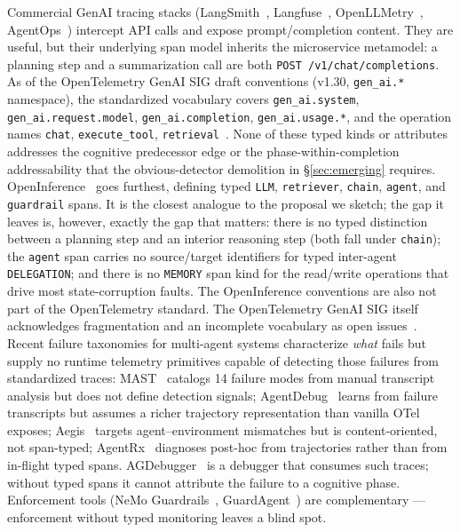 \documentclass[10pt,conference]{IEEEtran}
\begin{document}
Commercial GenAI tracing stacks (LangSmith~\cite{langsmith},
Langfuse~\cite{langfuse}, OpenLLMetry~\cite{openllmetry},
AgentOps~\cite{agentops}) intercept API calls and expose
prompt/completion content. They are useful, but their underlying span
model inherits the microservice metamodel: a planning step and a
summarization call are both \texttt{POST /v1/chat/completions}. As of
the OpenTelemetry GenAI SIG draft conventions (v1.30,
\texttt{gen\_ai.*} namespace), the standardized vocabulary covers
\texttt{gen\_ai.system}, \texttt{gen\_ai.request.model},
\texttt{gen\_ai.completion}, \texttt{gen\_ai.usage.*}, and the operation
names \texttt{chat}, \texttt{execute\_tool},
\texttt{retrieval}~\cite{otel_genai_sig}. None of these typed kinds or
attributes addresses the cognitive predecessor edge or the
phase-within-completion addressability that the obvious-detector
demolition in \S\ref{sec:emerging} requires.
OpenInference~\cite{openinference} goes furthest, defining typed
\texttt{LLM}, \texttt{retriever}, \texttt{chain}, \texttt{agent}, and
\texttt{guardrail} spans. It is the closest analogue to the
proposal we sketch; the gap it leaves is, however, exactly the gap
that matters: there is no typed distinction between a planning step
and an interior reasoning step (both fall under \texttt{chain}); the
\texttt{agent} span carries no source/target identifiers for typed
inter-agent \texttt{DELEGATION}; and there is no \texttt{MEMORY} span
kind for the read/write operations that drive most state-corruption
faults. The OpenInference conventions are also not part of the
OpenTelemetry standard. The OpenTelemetry GenAI SIG itself
acknowledges fragmentation and an incomplete vocabulary as open
issues~\cite{otel_genai_sig}. Recent failure taxonomies for multi-agent
systems characterize \emph{what} fails but supply no runtime telemetry
primitives capable of detecting those failures from standardized
traces: MAST~\cite{mast} catalogs 14 failure modes from manual
transcript analysis but does not define detection signals;
AgentDebug~\cite{agentdebug} learns from failure transcripts but
assumes a richer trajectory representation than vanilla OTel exposes;
Aegis~\cite{aegis} targets agent--environment mismatches but is
content-oriented, not span-typed; AgentRx~\cite{agentrx} diagnoses
post-hoc from trajectories rather than from in-flight typed spans.
AGDebugger~\cite{agdebugger} is a debugger that consumes such traces;
without typed spans it cannot attribute the failure to a cognitive
phase. Enforcement tools (NeMo Guardrails~\cite{nemo_guardrails},
GuardAgent~\cite{guardagent}) are complementary --- enforcement without
typed monitoring leaves a blind spot.
\end{document}
